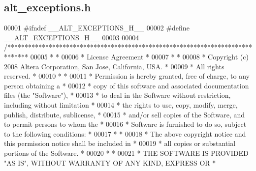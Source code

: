 \subsection{alt\+\_\+exceptions.\+h}
\label{alt__exceptions_8h_source}

\begin{DoxyCode}
00001 \textcolor{preprocessor}{#ifndef \_\_ALT\_EXCEPTIONS\_H\_\_}
00002 \textcolor{preprocessor}{#define \_\_ALT\_EXCEPTIONS\_H\_\_}
00003 
00004 \textcolor{comment}{/******************************************************************************}
00005 \textcolor{comment}{*                                                                             *}
00006 \textcolor{comment}{* License Agreement                                                           *}
00007 \textcolor{comment}{*                                                                             *}
00008 \textcolor{comment}{* Copyright (c) 2008 Altera Corporation, San Jose, California, USA.           *}
00009 \textcolor{comment}{* All rights reserved.                                                        *}
00010 \textcolor{comment}{*                                                                             *}
00011 \textcolor{comment}{* Permission is hereby granted, free of charge, to any person obtaining a     *}
00012 \textcolor{comment}{* copy of this software and associated documentation files (the "Software"),  *}
00013 \textcolor{comment}{* to deal in the Software without restriction, including without limitation   *}
00014 \textcolor{comment}{* the rights to use, copy, modify, merge, publish, distribute, sublicense,    *}
00015 \textcolor{comment}{* and/or sell copies of the Software, and to permit persons to whom the       *}
00016 \textcolor{comment}{* Software is furnished to do so, subject to the following conditions:        *}
00017 \textcolor{comment}{*                                                                             *}
00018 \textcolor{comment}{* The above copyright notice and this permission notice shall be included in  *}
00019 \textcolor{comment}{* all copies or substantial portions of the Software.                         *}
00020 \textcolor{comment}{*                                                                             *}
00021 \textcolor{comment}{* THE SOFTWARE IS PROVIDED "AS IS", WITHOUT WARRANTY OF ANY KIND, EXPRESS OR  *}

\end{DoxyCode}
